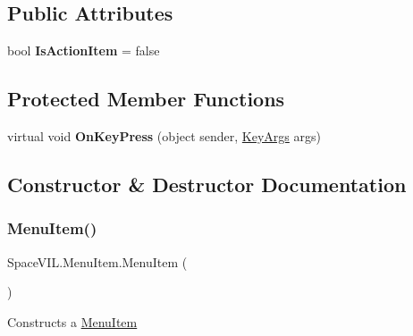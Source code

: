 \subsection*{Public Attributes}
\begin{DoxyCompactItemize}
\item 
\mbox{\label{class_space_v_i_l_1_1_menu_item_a8406c78ff330bd74c51573d208fafbb8}} 
bool {\bfseries Is\+Action\+Item} = false
\end{DoxyCompactItemize}
\subsection*{Protected Member Functions}
\begin{DoxyCompactItemize}
\item 
\mbox{\label{class_space_v_i_l_1_1_menu_item_afcdc082278d0031afdde49c27434ed40}} 
virtual void {\bfseries On\+Key\+Press} (object sender, \mbox{\hyperlink{class_space_v_i_l_1_1_core_1_1_key_args}{Key\+Args}} args)
\end{DoxyCompactItemize}


\subsection{Constructor \& Destructor Documentation}
\mbox{\label{class_space_v_i_l_1_1_menu_item_ac63df35b47cb47c446208e9024d070c8}} 
\subsubsection{\texorpdfstring{Menu\+Item()}{MenuItem()}\hspace{0.1cm}{\footnotesize\ttfamily [1/3]}}
{\footnotesize\ttfamily Space\+V\+I\+L.\+Menu\+Item.\+Menu\+Item (\begin{DoxyParamCaption}{ }\end{DoxyParamCaption})\hspace{0.3cm}{\ttfamily [inline]}}



Constructs a \mbox{\hyperlink{class_space_v_i_l_1_1_menu_item}{Menu\+Item}} 

